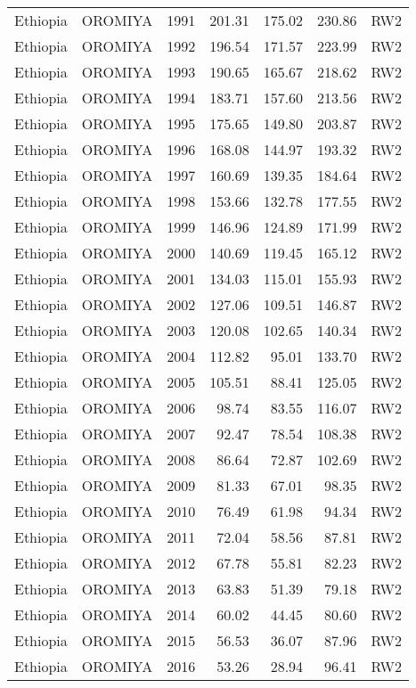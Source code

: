 \begin{longtable}{lllrrrl}
  Ethiopia & OROMIYA & 1991 & 201.31 & 175.02 & 230.86 & RW2 \\ 
  Ethiopia & OROMIYA & 1992 & 196.54 & 171.57 & 223.99 & RW2 \\ 
  Ethiopia & OROMIYA & 1993 & 190.65 & 165.67 & 218.62 & RW2 \\ 
  Ethiopia & OROMIYA & 1994 & 183.71 & 157.60 & 213.56 & RW2 \\ 
  Ethiopia & OROMIYA & 1995 & 175.65 & 149.80 & 203.87 & RW2 \\ 
  Ethiopia & OROMIYA & 1996 & 168.08 & 144.97 & 193.32 & RW2 \\ 
  Ethiopia & OROMIYA & 1997 & 160.69 & 139.35 & 184.64 & RW2 \\ 
  Ethiopia & OROMIYA & 1998 & 153.66 & 132.78 & 177.55 & RW2 \\ 
  Ethiopia & OROMIYA & 1999 & 146.96 & 124.89 & 171.99 & RW2 \\ 
  Ethiopia & OROMIYA & 2000 & 140.69 & 119.45 & 165.12 & RW2 \\ 
  Ethiopia & OROMIYA & 2001 & 134.03 & 115.01 & 155.93 & RW2 \\ 
  Ethiopia & OROMIYA & 2002 & 127.06 & 109.51 & 146.87 & RW2 \\ 
  Ethiopia & OROMIYA & 2003 & 120.08 & 102.65 & 140.34 & RW2 \\ 
  Ethiopia & OROMIYA & 2004 & 112.82 & 95.01 & 133.70 & RW2 \\ 
  Ethiopia & OROMIYA & 2005 & 105.51 & 88.41 & 125.05 & RW2 \\ 
  Ethiopia & OROMIYA & 2006 & 98.74 & 83.55 & 116.07 & RW2 \\ 
  Ethiopia & OROMIYA & 2007 & 92.47 & 78.54 & 108.38 & RW2 \\ 
  Ethiopia & OROMIYA & 2008 & 86.64 & 72.87 & 102.69 & RW2 \\ 
  Ethiopia & OROMIYA & 2009 & 81.33 & 67.01 & 98.35 & RW2 \\ 
  Ethiopia & OROMIYA & 2010 & 76.49 & 61.98 & 94.34 & RW2 \\ 
  Ethiopia & OROMIYA & 2011 & 72.04 & 58.56 & 87.81 & RW2 \\ 
  Ethiopia & OROMIYA & 2012 & 67.78 & 55.81 & 82.23 & RW2 \\ 
  Ethiopia & OROMIYA & 2013 & 63.83 & 51.39 & 79.18 & RW2 \\ 
  Ethiopia & OROMIYA & 2014 & 60.02 & 44.45 & 80.60 & RW2 \\ 
  Ethiopia & OROMIYA & 2015 & 56.53 & 36.07 & 87.96 & RW2 \\ 
  Ethiopia & OROMIYA & 2016 & 53.26 & 28.94 & 96.41 & RW2 \\ 

\end{longtable}

